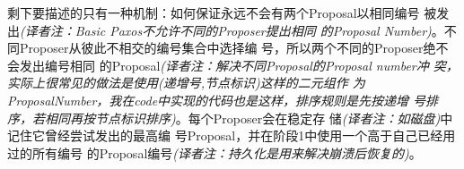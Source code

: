 剩下要描述的只有一种机制：如何保证永远不会有两个Proposal以相同编号
被发出\emph{(译者注：Basic Paxos不允许不同的Proposer提出相同
的Proposal Number)}。不同Proposer从彼此不相交的编号集合中选择编
号，所以两个不同的Proposer绝不会发出编号相同
的Proposal\emph{(译者注：解决不同Proposal的Proposal number冲
突，实际上很常见的做法是使用(递增号,节点标识)这样的二元组作
为ProposalNumber，我在code中实现的代码也是这样，排序规则是先按递增
号排序，若相同再按节点标识排序)}。每个Proposer会在稳定存
储\emph{(译者注：如磁盘)}中记住它曾经尝试发出的最高编
号Proposal，并在阶段1中使用一个高于自己已经用过的所有编号
的Proposal编号\emph{(译者注：持久化是用来解决崩溃后恢复的)}。
